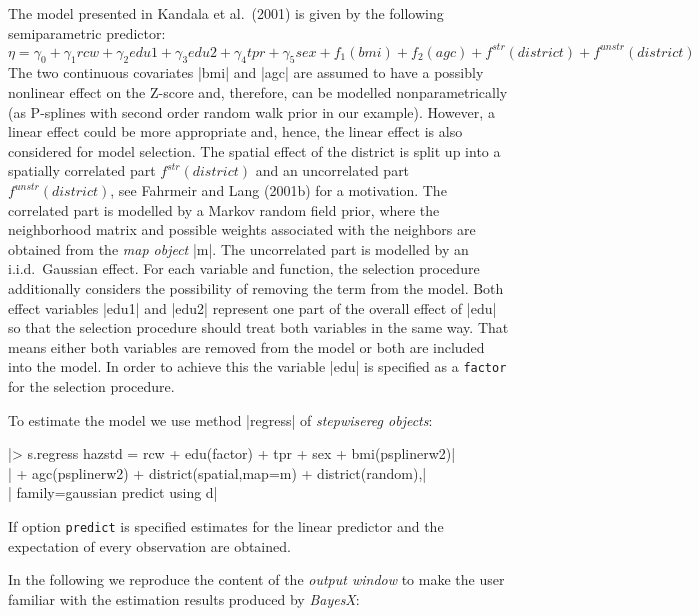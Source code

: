 The model presented in Kandala et al.~(2001) is given by the following semiparametric predictor:
\[\eta=\gamma_0+\gamma_1rcw+\gamma_2edu1+\gamma_3edu2+\gamma_4tpr+\gamma_5sex+f_1(bmi)+f_2(agc)+f^{str}(district)+f^{unstr}(district)\]
The two continuous covariates |bmi| and |agc| are assumed to have a possibly nonlinear effect on the Z-score and, therefore,
can be modelled nonparametrically (as P-splines with second order random walk prior in our example). However, a linear effect
could be more appropriate and, hence, the linear effect is also considered for model selection. The spatial effect of the
district is split up into a spatially correlated part $f^{str}(district)$ and an uncorrelated part $f^{unstr}(district)$, see
Fahrmeir and Lang (2001b) for a motivation. The correlated part is modelled by a Markov random field prior, where the
neighborhood matrix and possible weights associated with the neighbors are obtained from the {\it map object} |m|. The
uncorrelated part is modelled by an i.i.d.~Gaussian effect. For each variable and function, the selection procedure
additionally considers the possibility of removing the term from the model. Both effect variables |edu1| and |edu2| represent
one part of the overall effect of |edu| so that the selection procedure should treat both variables in the same way. That means
either both variables are removed from the model or both are included into the model. In order to achieve this the variable
|edu| is specified as a {\tt factor} for the selection procedure.


To estimate the model we use method |regress| of {\it stepwisereg objects}:

 |> s.regress hazstd = rcw + edu(factor) + tpr + sex + bmi(psplinerw2)|\\
 |  + agc(psplinerw2) + district(spatial,map=m) + district(random),|\\
 |  family=gaussian predict using d|


If option {\tt predict} is specified estimates for the linear predictor and the expectation of every observation are obtained.

In the following we reproduce the content of the {\it output window} to make the user familiar with the estimation results
produced by {\it BayesX}:

